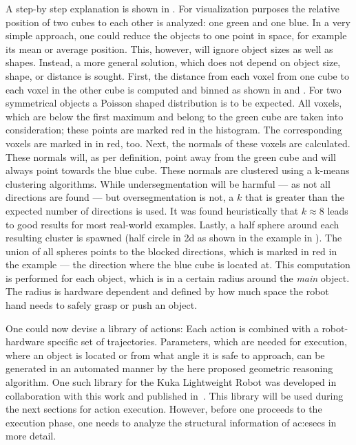 A step-by step explanation is shown in .
For visualization purposes the relative position of two cubes to each other is analyzed: one green and one blue.
In a very simple approach, one could reduce the objects to one point in space, for example its mean or average position.
This, however, will ignore object sizes as well as shapes.
Instead, a more general solution, which does not depend on object size, shape, or distance is sought.
First, the distance from each voxel from one cube to each voxel in the other cube is computed and binned as shown in  and .
For two symmetrical objects a Poisson shaped distribution is to be expected.
All voxels, which are below the first maximum and belong to the green cube are taken into consideration; these points are marked red in the histogram.
The corresponding voxels are marked in  in red, too.
Next, the normals of these voxels are calculated.
These normals will, as per definition, point away from the green cube and will always point towards the blue cube.
These normals are clustered using a k-means clustering algorithms.
While undersegmentation will be harmful --- as not all directions are found --- but oversegmentation is not, a $k$ that is greater than the expected number of directions is used.
It was found heuristically that $k \approx 8$ leads to good results for most real-world examples.
Lastly, a half sphere around each resulting cluster is spawned (half circle in 2d as shown in the example in ).
The union of all spheres points to the blocked directions, which is marked in red in the example --- the direction where the blue cube is located at.
This computation is performed for each object, which is in a certain radius around the \emph{main} object.
The radius is hardware dependent and defined by how much space the robot hand needs to safely grasp or push an object.

One could now devise a library of actions: Each action is combined with a robot-hardware specific set of trajectories.
Parameters, which are needed for execution, \ie where an object is located or from what angle it is safe to approach, can be generated in an automated manner by the here proposed geometric reasoning algorithm.
One such library for the Kuka Lightweight Robot was developed in collaboration with this work and published in~\cite{aeinaksoytamosiunaite2013}.
This library will be used during the next sections for action execution.
However, before one proceeds to the execution phase, one needs to analyze the structural information of \glspl{ac:esec} in more detail.
